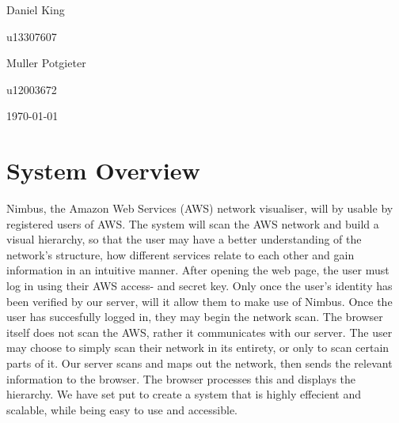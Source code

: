 \documentclass[hidelinks,a4paper,12pt]{article}
\begin{document}
\begin{titlepage}
\begin{center}
\begin{minipage}{0.4\textwidth}
\begin{flushleft} \large
Daniel {King}
\end{flushleft}
\end{minipage}
\begin{minipage}{0.4\textwidth}
\begin{flushright} \large
\emph{}
u13307607
\end{flushright}
\end{minipage}

\begin{minipage}{0.4\textwidth}
\begin{flushleft} \large
Muller {Potgieter}
\end{flushleft}
\end{minipage}
\begin{minipage}{0.4\textwidth}
\begin{flushright} \large
\emph{}
u12003672
\end{flushright}
\end{minipage}
\vfill
{\large \today}
\end{center}
\end{titlepage}
\footnotesize
%
\normalsize


\tableofcontents
\newpage
{}

\newpage
\section{System Overview} 

Nimbus, the Amazon Web Services (AWS) network visualiser, will by usable by registered users of AWS. The system will scan the AWS network and build a visual hierarchy, so that the user may have a better understanding of the network's structure, how different services relate to each other and gain information in an intuitive manner. After opening the web page, the user must log in using their AWS access- and secret key. Only once the user's identity has been verified by our server, will it allow them to make use of Nimbus. Once the user has succesfully logged in, they may begin the network scan. The browser itself does not scan the AWS, rather it communicates with our server. The user may choose to simply scan their network in its entirety, or only to scan certain parts of it. Our server scans and maps out the network, then sends the relevant information to the browser. The browser processes this and displays the hierarchy.
\newline
We have set put to create a system that is highly effecient and scalable, while being easy to use and accessible.
\end{document}
